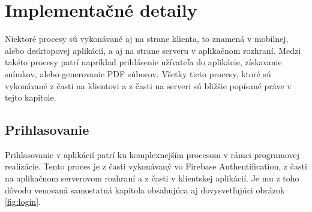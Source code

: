 \section{Implementačné detaily}
Niektoré procesy sú vykonávané aj na strane klienta, to znamená v mobilnej, alebo desktopovej aplikácií, a aj na strane serveru v aplikačnom rozhraní. Medzi takéto procesy patrí napríklad prihlásenie užívateľa do aplikácie, získavanie snímkov, alebo generovanie PDF súborov. Všetky tieto procesy, ktoré sú vykonávané z časti na klientovi a z časti na serveri sú bližšie popísané práve v tejto kapitole.

\subsection{Prihlasovanie}
Prihlasovanie v aplikácií patrí ku komplexnejším procesom v rámci programovej realizácie. Tento proces je z časti vykonávaný vo Firebase Authentification, z časti na aplikačnom serverovom rozhraní a z časti v klientskej aplikácií. Je mu z toho dôvodu venovaná samostatná kapitola obsahujúca aj dovysvetľujúci obrázok \ref{fig:login}.

